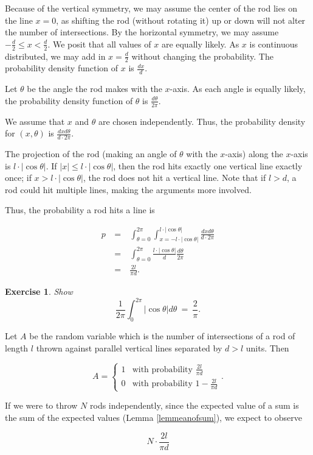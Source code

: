 \documentclass[12pt,letterpaper]{report}
\newcommand\be{\begin{equation}}
\newcommand\ee{\end{equation}}
\newcommand\bea{\begin{eqnarray}}
\newcommand\eea{\end{eqnarray}}
\newtheorem{exe}[thm]{Exercise}
\newcommand{\twocase}[5]{#1 \begin{cases} #2 & \text{#3}\\ #4
&\text{#5} \end{cases}   }
\begin{document}
Because of the vertical symmetry, we may assume the center of the
rod lies on the line $x = 0$, as shifting the rod (without
rotating it) up or down will not alter the number of
intersections. By the horizontal symmetry, we may assume
$-\frac{d}{2} \le x < \frac{d}{2}$. We posit that all values of
$x$ are equally likely. As $x$ is continuous distributed, we may
add in $x = \frac{d}{2}$ without changing the probability. The
probability density function of $x$ is $\frac{dx}{d}$.

Let $\theta$ be the angle the rod makes with the $x$-axis. As each
angle is equally likely, the probability density function of
$\theta$ is $\frac{d\theta}{2\pi}$.

We assume that $x$ and $\theta$ are chosen independently. Thus,
the probability density for $(x,\theta)$ is $\frac{dx d\theta}{d
\cdot 2\pi}$.

The projection of the rod (making an angle of $\theta$ with the
$x$-axis) along the $x$-axis is $l \cdot |\cos \theta|$. If $|x|
\le l \cdot |\cos \theta|$, then the rod hits exactly one vertical
line exactly once; if $x > l \cdot |\cos \theta|$, the rod does
not hit a vertical line. Note that if $l > d$, a rod could hit
multiple lines, making the arguments more involved.

Thus, the probability a rod hits a line is

\bea p & \ = \ &  \int_{\theta = 0}^{2\pi} \int_{x=-l \cdot |\cos
\theta|}^{l \cdot |\cos \theta|} \frac{dxd\theta}{d \cdot 2\pi}
\nonumber\\ & \ = \ & \int_{\theta = 0}^{2\pi} \frac{l \cdot |\cos
\theta|}{d} \frac{d\theta}{2\pi} \nonumber\\ & \ = \ &
\frac{2l}{\pi d}. \eea

\begin{exe} Show
\be \frac{1}{2\pi} \int_{0}^{2\pi} |\cos \theta| d\theta \ = \
\frac{2}{\pi}. \ee
\end{exe}

Let $A$ be the random variable which is the number of
intersections of a rod of length $l$ thrown against parallel
vertical lines separated by $d > l$ units. Then

\be \twocase{A =}{1}{with probability $\frac{2l}{\pi d}$}{0}{with
probability $1 - \frac{2l}{\pi d}$}. \ee

If we were to throw $N$ rods independently, since the expected
value of a sum is the sum of the expected values (Lemma
\ref{lemmeanofsum}), we expect to observe

\be N \cdot \frac{2l}{\pi d} \ee
\end{document}
